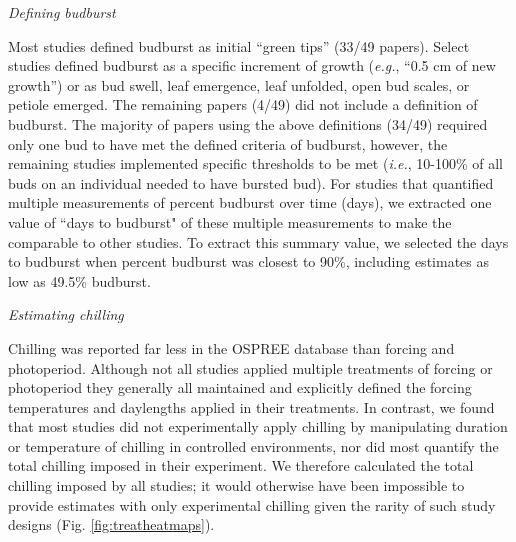 \documentclass{article}
\begin{document}
\par \emph{Defining budburst}

Most studies defined budburst as initial ``green tips'' (33/49 papers). Select studies defined budburst as a specific increment of growth (\emph{e.g.}, ``0.5 cm of new growth'') or as bud swell, leaf emergence, leaf unfolded, open bud scales, or petiole emerged. The remaining papers (4/49) did not include a definition of budburst. The majority of papers using the above definitions (34/49) required only one bud to have met the defined criteria of budburst, however, the remaining studies implemented specific thresholds to be met (\emph{i.e.}, 10-100\% of all buds on an individual needed to have bursted bud). For studies that quantified multiple measurements of percent budburst over time (days), we extracted one value of ``days to budburst" of these multiple measurements to make the comparable to other studies. To extract this summary value, we selected the days to budburst when percent budburst was closest to 90\%, including estimates as low as 49.5\% budburst. 

\par{\emph{Estimating chilling}}

Chilling was reported far less in the OSPREE database than forcing and photoperiod. Although not all studies applied multiple treatments of forcing or photoperiod they generally all maintained and explicitly defined the forcing temperatures and daylengths applied in their treatments. In contrast, we found that most studies did not experimentally apply chilling by manipulating duration or temperature of chilling in controlled environments, nor did most quantify the total chilling imposed in their experiment. We therefore calculated the total chilling imposed by all studies;  it would otherwise have been impossible to provide estimates with only experimental chilling given the rarity of such study designs (Fig. \ref{fig:treatheatmaps}). 
\end{document}

